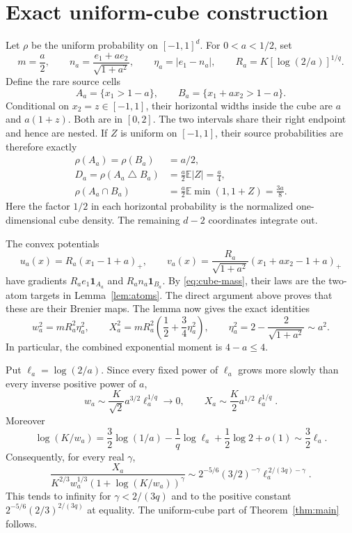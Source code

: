 \documentclass[11pt]{article}
\theoremstyle{remark}\newtheorem{remark}[theorem]{Remark}
\newcommand{\E}{\mathbb E}
\newcommand{\ind}{\mathbf 1}
\begin{document}
\section{Exact uniform-cube construction}
Let $\rho$ be the uniform probability on $[-1,1]^d$. For
$0<a<1/2$, set
\[
 m=\frac a2,\qquad
 n_a=\frac{e_1+a e_2}{\sqrt{1+a^2}},\qquad
 \eta_a=|e_1-n_a|,\qquad
 R_a=K[\log(2/a)]^{1/q}.
\]
Define the rare source cells
\[
 A_a=\{x_1>1-a\},\qquad
 B_a=\{x_1+a x_2>1-a\}.
\]
Conditional on $x_2=z\in[-1,1]$, their horizontal widths inside the
cube are $a$ and $a(1+z)$. Both are in $[0,2]$. The two intervals
share their right endpoint and hence are nested. If $Z$ is uniform
on $[-1,1]$, their source probabilities are therefore exactly
\begin{align}
 \rho(A_a)=\rho(B_a)&=a/2,\label{eq:cube-mass}\\
 D_a=\rho(A_a\mathbin\triangle B_a)
   &=\frac a2\E|Z|=\frac a4,\label{eq:cube-diff}\\
 \rho(A_a\cap B_a)
   &=\frac a2\E\min(1,1+Z)=\frac{3a}{8}.
   \label{eq:cube-intersection}
\end{align}
Here the factor $1/2$ in each horizontal probability is the normalized
one-dimensional cube density. The remaining $d-2$ coordinates
integrate out.

The convex potentials
\[
 u_a(x)=R_a(x_1-1+a)_+,\qquad
 v_a(x)=\frac{R_a}{\sqrt{1+a^2}}(x_1+a x_2-1+a)_+
\]
have gradients $R_a e_1\ind_{A_a}$ and $R_a n_a\ind_{B_a}$.
By \eqref{eq:cube-mass}, their laws are the two-atom targets in
Lemma~\ref{lem:atoms}. The direct argument above proves that these
are their Brenier maps. The lemma now gives the exact identities
\begin{equation}\label{eq:cube-exact}
 w_a^2=mR_a^2\eta_a^2,\qquad
 X_a^2=mR_a^2\left(\frac12+\frac34\eta_a^2\right),\qquad
 \eta_a^2=2-\frac2{\sqrt{1+a^2}}\sim a^2.
\end{equation}
In particular, the combined exponential moment is $4-a\le4$.

Put $\ell_a=\log(2/a)$. Since every fixed power of $\ell_a$ grows
more slowly than every inverse positive power of $a$,
\[
 w_a\sim\frac K{\sqrt2}a^{3/2}\ell_a^{1/q}\longrightarrow0,
 \qquad
 X_a\sim\frac K2 a^{1/2}\ell_a^{1/q}.
\]
Moreover
\[
 \log(K/w_a)
 =\frac32\log(1/a)-\frac1q\log\ell_a
      +\frac12\log2+o(1)
 \sim\frac32\ell_a.
\]
Consequently, for every real $\gamma$,
\begin{equation}\label{eq:cube-ratio}
 \frac{X_a}{K^{2/3}w_a^{1/3}(1+\log(K/w_a))^\gamma}
 \sim 2^{-5/6}(3/2)^{-\gamma}
                   \ell_a^{\,2/(3q)-\gamma}.
\end{equation}
This tends to infinity for $\gamma<2/(3q)$ and to the positive constant
$2^{-5/6}(2/3)^{2/(3q)}$ at equality. The uniform-cube part of
Theorem~\ref{thm:main} follows.
\end{document}

